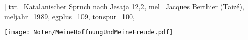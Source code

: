 [
    txt={Katalanischer Spruch nach Jesaja 12,2}, 
    mel={Jacques Berthier (Taizé)}, 
    meljahr={1989}, 
    egplus={109},
    tonspur={100}, 
]

\beginverse
\endverse
\texttt{[image: Noten/MeineHoffnungUndMeineFreude.pdf]}

\endsong
